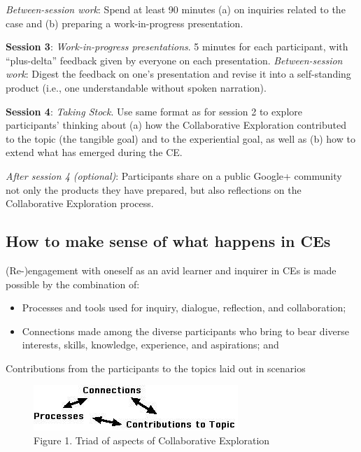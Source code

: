 \medskip\noindent \emph{Between-session work}: Spend at least 90 minutes (a) on inquiries
related to the case and (b) preparing a work-in-progress presentation.

\medskip\noindent \textbf{Session 3}: \emph{Work-in-progress presentations}. 5 minutes for
each participant, with ``plus-delta'' feedback given by everyone on each
presentation. \emph{Between-session work}: Digest the feedback on one's
presentation and revise it into a self-standing product (i.e., one
understandable without spoken narration). 

\medskip\noindent \textbf{Session 4}: \emph{Taking Stock}. Use same format as for session 2 to explore
participants' thinking about (a) how the Collaborative Exploration
contributed to the topic (the tangible goal) and to the experiential
goal, as well as (b) how to extend what has emerged during the CE.

\medskip\noindent \emph{After session 4 (optional)}: Participants share on a public
Google+ community not only the products they have prepared, but also
reflections on the Collaborative Exploration process.

\subsection{How to make sense of what happens in CEs}

(Re-)engagement with oneself as an avid learner and inquirer in CEs is
made possible by the combination of:

\begin{itemize}
\item
  Processes and tools used for inquiry, dialogue, reflection, and
  collaboration;
\item
  Connections made among the diverse participants who bring to bear
  diverse interests, skills, knowledge, experience, and aspirations; and
\end{itemize}
Contributions from the participants to the topics laid out in scenarios

\begin{figure}[htbp]
\centering
\includegraphics[width=.8\textwidth]{../pictures/ce.jpg}
\caption*{Figure 1.  Triad of aspects of Collaborative Exploration}
\end{figure}

